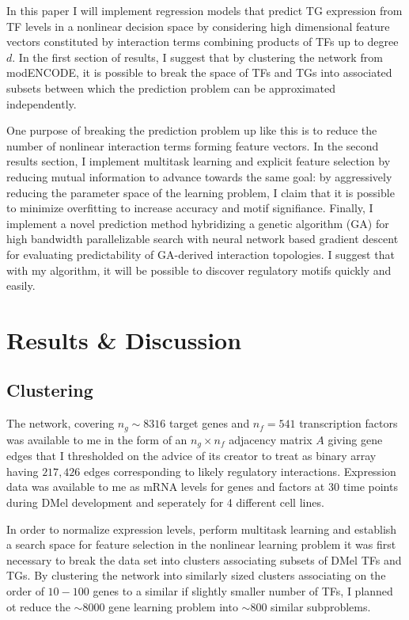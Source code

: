 \documentclass[12pt,a4paper]{article}
\begin{document}
\begin{multicols}{2}
In this paper I will implement regression models that predict TG expression from TF levels in a nonlinear decision space by considering high dimensional feature vectors constituted by interaction terms combining products of TFs up to degree $d$. In the first section of results, I suggest that by clustering the network from modENCODE, it is possible to break the space of TFs and TGs into associated subsets between which the prediction problem can be approximated independently. 

One purpose of breaking the prediction problem up like this is to reduce the number of nonlinear interaction terms forming feature vectors. In the second results section, I implement multitask learning and explicit feature selection by reducing mutual information to advance towards the same goal: by aggressively reducing the parameter space of the learning problem, I claim that it is possible to minimize overfitting to increase accuracy and motif signifiance. Finally, I implement a novel prediction method hybridizing a genetic algorithm (GA) for high bandwidth parallelizable search with neural network based gradient descent for evaluating predictability of GA-derived interaction topologies. I suggest that with my algorithm, it will be possible to discover regulatory motifs quickly and easily.



\section{Results \& Discussion}
\subsection{Clustering}\label{clustering}
The network, covering $n_g \sim 8316$ target genes and $n_f = 541$ transcription factors was available to me in the form of an $n_g\times n_f$ adjacency matrix $A$ giving gene edges that I thresholded on the advice of its creator to treat as binary array having $217,426$ edges corresponding to likely regulatory interactions. Expression data was available to me as mRNA levels for genes and factors at 30 time points during DMel development and seperately for 4 different cell lines.

In order to normalize expression levels, perform multitask learning and establish a search space for feature selection in the nonlinear learning problem it was first necessary to break the data set into clusters associating subsets of DMel TFs and TGs. By clustering the network into similarly sized clusters associating on the order of $10-100$ genes to a similar if slightly smaller number of TFs, I planned ot reduce the $\sim 8000$ gene learning problem into $\sim 800$ similar subproblems. 


\end{multicols}
\end{document}
